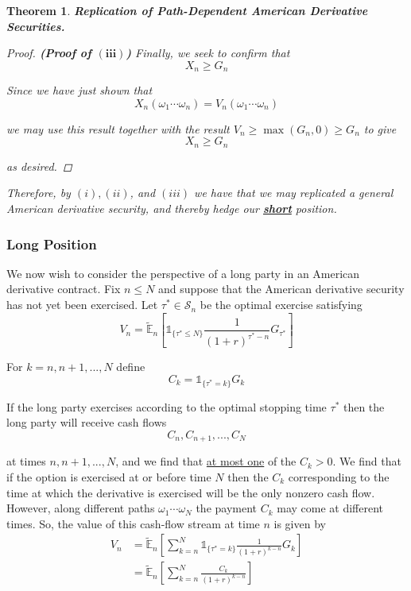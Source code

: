 \documentclass[12pt]{article}
\newtheorem{theorem}{Theorem}
\newlength\tindent
\renewcommand{\indent}{\hspace*{\tindent}}
\newcommand{\E}{\mathbb E}
\begin{document}
\begin{theorem} {\bf Replication of Path-Dependent American Derivative Securities.}
\begin{proof} {\bf {\em (Proof of $\bm{(iii)}$)}} Finally, we seek to confirm that
\begin{equation*}
	X_n \geq G_n
\end{equation*}

Since we have just shown that
\begin{equation*}
	X_n(\omega_1\cdots\omega_n) = V_n(\omega_1\cdots\omega_n)
\end{equation*}

we may use this result together with the result $V_n \geq \max (G_n, 0) \geq G_n$ to give
\begin{equation*}
	X_n \geq G_n
\end{equation*}

as desired.
\end{proof}

\indent Therefore, by $(i), (ii)$, and $(iii)$ we have that we may replicated a general American derivative security, and thereby hedge our \underline{\bf short} position.
\end{theorem}

\subsubsection{Long Position}

\indent We now wish to consider the perspective of a long party in an American derivative contract. Fix $n \leq N$ and suppose that the American derivative security has not yet been exercised. Let $\tau^* \in \mathcal S_n$ be the optimal exercise satisfying
\begin{equation*}
	V_n = \tilde{\E}_n \left[ \mathds 1_{\{\tau^*\leq N\}} \frac{1}{(1 + r)^{\tau^* - n}} G_{\tau^*} \right]
\end{equation*}

For $k = n, n + 1,..., N$ define
\begin{equation*}
	C_k = \mathds 1_{\{ \tau^* = k \}} G_k
\end{equation*}

\indent If the long party exercises according to the optimal stopping time $\tau^*$ then the long party will receive cash flows
\begin{equation*}
	C_n,C_{n + 1},...,C_N
\end{equation*}

at times $n,n + 1,...,N$, and we find that \underline{at most one} of the $C_k > 0$. We find that if the option is exercised at or before time $N$ then the $C_k$ corresponding to the time at which the derivative is exercised will be the only nonzero cash flow. However, along different paths $\omega_1\cdots\omega_N$ the payment $C_k$ may come at different times. So, the value of this cash-flow stream at time $n$ is given by
\begin{align*}
	V_n &= \tilde{\E}_n \left[ \sum^N_{k = n} \mathds 1_{\{\tau^* = k\}} \frac{1}{(1 + r)^{k - n}}G_k \right] \\
	&= \tilde{\E}_n \left[ \sum^N_{k = n} \frac{C_k}{(1 + r)^{k - n}} \right]
\end{align*}
\end{document}
